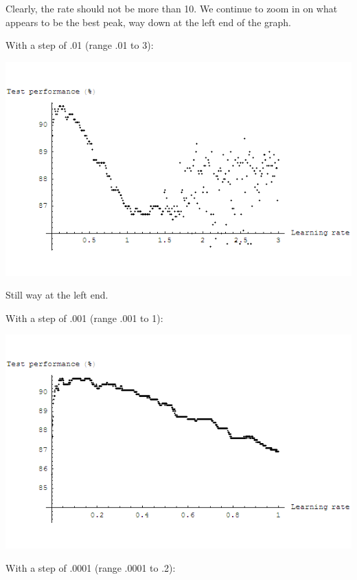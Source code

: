 \documentclass{article}
\begin{document}
\begin{enumerate}
\begin{enumerate}
      Clearly, the rate should not be more than 10. We continue to
      zoom in on what appears to be the best peak, way down at the
      left end of the graph.

      With a step of .01 (range .01 to 3):

      \begin{center}
        \includegraphics[scale=.5]{plot_test_01.png}
      \end{center}

      Still way at the left end.

      With a step of .001 (range .001 to 1):

      \begin{center}
        \includegraphics[scale=.5]{plot_test_001.png}
      \end{center}

      With a step of .0001 (range .0001 to .2):


\end{enumerate}
\end{enumerate}
\end{document}
